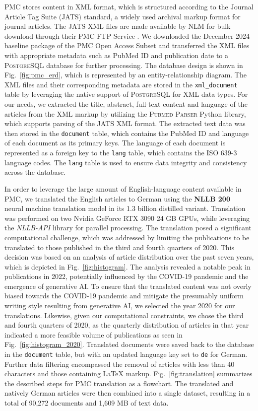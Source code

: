 PMC stores content in XML format, which is structured according to the Journal
Article Tag Suite (JATS) standard, a widely used archival markup format for
journal articles. The JATS XML files are made available by NLM for bulk download
through their PMC FTP Service \cite{pmcoa}. We downloaded the December 2024
baseline package of the PMC Open Access Subset and transferred the XML files
with appropriate metadata such as PubMed ID and publication date to a
\textsc{PostgreSQL} database for further processing. The database design is
shown in Fig.~\ref{fig:pmc_erd}, which is represented by an entity-relationship
diagram. The XML files and their corresponding metadata are stored in the
\texttt{xml\_document} table by leveraging the native support of
\textsc{PostgreSQL} for XML data types. For our needs, we extracted the title,
abstract, full-text content and language of the articles from the XML markup by
utilizing the \textsc{Pubmed Parser} \cite{achakulvisut2020} Python library,
which supports parsing of the JATS XML format. The extracted text data was then
stored in the \texttt{document} table, which contains the PubMed ID and language
of each document as its primary keys. The language of each document is
represented as a foreign key to the \texttt{lang} table, which contains the ISO
639-3 language codes. The \texttt{lang} table is used to ensure data integrity
and consistency across the database.

In order to leverage the large amount of English-language content available in
PMC, we translated the English articles to German using the \textbf{NLLB
200}~\cite{costa2022no} neural machine translation model in its 1.3 billion
distilled variant. Translation was performed on two Nvidia GeForce RTX 3090 24
GB GPUs, while leveraging the \textit{NLLB-API} \cite{nllbAPI} library for
parallel processing. The translation posed a significant computational
challenge, which was addressed by limiting the publications to be translated to
those published in the third and fourth quarters of 2020. This decision was
based on an analysis of article distribution over the past seven years, which is
depicted in Fig.~\ref{fig:histogram}. The analysis revealed a notable peak in
publications in 2022, potentially influenced by the COVID-19 pandemic and the
emergence of generative AI. To ensure that the translated content was not overly
biased towards the COVID-19 pandemic and mitigate the presumably uniform writing
style resulting from generative AI, we selected the year 2020 for our
translations. Likewise, given our computational constraints, we chose the third
and fourth quarters of 2020, as the quarterly distribution of articles in that
year indicated a more feasible volume of publications as seen in
Fig.~\ref{fig:histogram_2020}. Translated documents were saved back to the
database in the \texttt{document} table, but with an updated language key set to
\texttt{de} for German. Further data filtering encompassed the removal of
articles with less than 40 characters and those containing \LaTeX{} markup.
Fig.~\ref{fig:translation} summarizes the described steps for PMC translation as
a flowchart. The translated and natively German articles were then combined into
a single dataset, resulting in a total of 90,272 documents and 1,609 MB of text
data.


